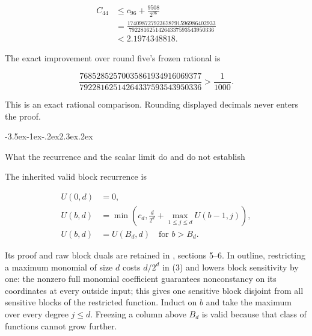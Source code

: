 \documentclass[11pt]{article}
\makeatletter
\renewcommand\section{\@startsection{section}{1}{\z@}
  {-3.5ex\@plus -1ex\@minus -.2ex}{2.3ex\@plus .2ex}
  {\normalfont\Large\bfseries\raggedright}}
\theoremstyle{remark}
\theoremstyle{correctionstyle}
\makeatother
\begin{document}
\begin{equation}
\begin{aligned}C_{44}&\le c_{96}+\frac{9508}{2^{96}}\\
&=\frac{174098727923678791596986402933}{79228162514264337593543950336}\\
&<2.1974348818.\end{aligned}\tag{12}
\label{src-p081}
\end{equation}

\leavevmode\label{src-p082}The exact improvement over round five's frozen rational is\label{src-end-p082}\par

\begin{equation}
\frac{76852852570035861934916069377}{79228162514264337593543950336}>\frac{1}{1000}.\tag*{}
\label{src-p083}
\end{equation}

\leavevmode\label{src-p084}This is an exact rational comparison. Rounding displayed decimals never
enters the proof.\label{src-end-p084}\par

\section{What the recurrence and the scalar limit do and do not establish}\label{src-p085}\label{src-end-p085}

\leavevmode\label{src-p086}The inherited valid block recurrence is\label{src-end-p086}\par

\begin{equation}
\begin{aligned}U(0,d)&=0,\\
U(b,d)&=\min\left(c_d,\frac d{2^d}+\max_{1\le j\le d}U(b-1,j)\right),\\
U(b,d)&=U(B_d,d)\quad\text{for }b>B_d.
\end{aligned}\tag*{}
\label{src-p087}
\end{equation}

\leavevmode\label{src-p088}Its proof and raw block duals are retained in , sections
5–6. In outline, restricting a maximum monomial of size $d$ costs $d/2^d$
in (3) and lowers block sensitivity by one: the nonzero full monomial
coefficient guarantees nonconstancy on its coordinates at every outside
input; this gives one sensitive block disjoint from all sensitive blocks
of the restricted function. Induct on $b$ and take the maximum over every
degree $j\le d$. Freezing a column above $B_d$ is valid because that class of
functions cannot grow further.\label{src-end-p088}\par
\end{document}
